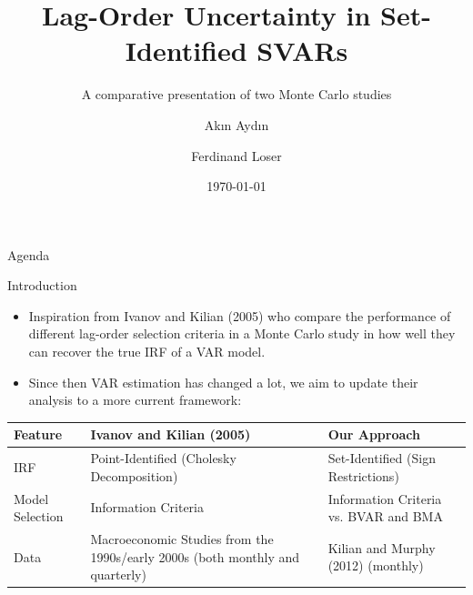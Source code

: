 \documentclass[aspectratio=169]{beamer}
\title[Lag-Order Uncertainty in Set-Identified SVARs]{Lag-Order Uncertainty in Set-Identified SVARs}
\subtitle{A comparative presentation of two Monte Carlo studies}
\author[Ak\i n Ayd\i n \& Ferdinand Loser]{Ak\i n Ayd\i n \and Ferdinand Loser}
\institute{Ludwig-Maximilian University of Munich}
\date{\today}
\begin{document}
\begin{frame}
  \titlepage
\end{frame}

\begin{frame}{Agenda}
  \tableofcontents
\end{frame}


\begin{frame}{Introduction}
  \begin{itemize}
    \item Inspiration from Ivanov and Kilian (2005) who compare the performance of different lag-order selection criteria in a Monte Carlo study in how well they can recover the true IRF of a VAR model.
    \item Since then VAR estimation has changed a lot, we aim to update their analysis to a more current framework:
  \end{itemize}
  \begin{table}
        \begin{tabular}{@{} l p{5cm} p{5cm} @{}}
            \toprule
            \textbf{Feature} & \textbf{Ivanov and Kilian (2005)} & \textbf{Our Approach} \\
            \midrule
            IRF & Point-Identified (Cholesky Decomposition) & Set-Identified (Sign Restrictions) \\ 
            \addlinespace
            Model Selection & Information Criteria & Information Criteria vs. BVAR and BMA \\
            \addlinespace
            Data & Macroeconomic Studies from the 1990s/early 2000s (both monthly and quarterly) & Kilian and Murphy (2012) (monthly)\\
            \bottomrule
        \end{tabular}
    \end{table}
\end{frame}
\end{document}
